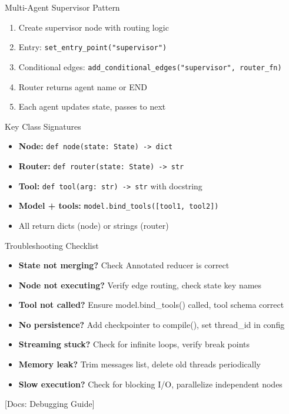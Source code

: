 \documentclass[aspectratio=169,11pt]{beamer}
\newcommand{\docref}[1]{{\scriptsize\color{docgray}[Docs: #1]}}
\begin{document}
\begin{frame}{Multi-Agent Supervisor Pattern}
\setlength{\itemsep}{1pt}
\begin{enumerate}
\item Create supervisor node with routing logic
\item Entry: \texttt{set\_entry\_point("supervisor")}
\item Conditional edges: \texttt{add\_conditional\_edges("supervisor", router\_fn)}
\item Router returns agent name or END
\item Each agent updates state, passes to next
\end{enumerate}
\end{frame}

\begin{frame}{Key Class Signatures}
\setlength{\itemsep}{1pt}
\begin{itemize}
\item \textbf{Node:} \texttt{def node(state: State) -> dict}
\item \textbf{Router:} \texttt{def router(state: State) -> str}
\item \textbf{Tool:} \texttt{def tool(arg: str) -> str} with docstring
\item \textbf{Model + tools:} \texttt{model.bind\_tools([tool1, tool2])}
\item All return dicts (node) or strings (router)
\end{itemize}
\end{frame}

\begin{frame}{Troubleshooting Checklist}
\setlength{\itemsep}{1pt}
\begin{itemize}
\item \textbf{State not merging?} Check Annotated reducer is correct
\item \textbf{Node not executing?} Verify edge routing, check state key names
\item \textbf{Tool not called?} Ensure model.bind\_tools() called, tool schema correct
\item \textbf{No persistence?} Add checkpointer to compile(), set thread\_id in config
\item \textbf{Streaming stuck?} Check for infinite loops, verify break points
\item \textbf{Memory leak?} Trim messages list, delete old threads periodically
\item \textbf{Slow execution?} Check for blocking I/O, parallelize independent nodes
\end{itemize}
\vspace{0.1cm}
\docref{Debugging Guide}
\end{frame}
\end{document}
